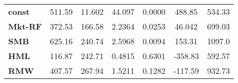 \begin{center}
\begin{tabular}{lcccccc}
\midrule
\textbf{const}  &       511.59       &       11.602       &      44.097     &      0.0000      &       488.85      &       534.33       \\
\textbf{Mkt-RF} &       372.53       &       166.58       &      2.2364     &      0.0253      &       46.042      &       699.03       \\
\textbf{SMB}    &       625.16       &       240.74       &      2.5968     &      0.0094      &       153.31      &       1097.0       \\
\textbf{HML}    &       116.87       &       242.71       &      0.4815     &      0.6301      &      -358.83      &       592.57       \\
\textbf{RMW}    &       407.57       &       267.94       &      1.5211     &      0.1282      &      -117.59      &       932.73       \\
\bottomrule
\end{tabular}
\end{center}
